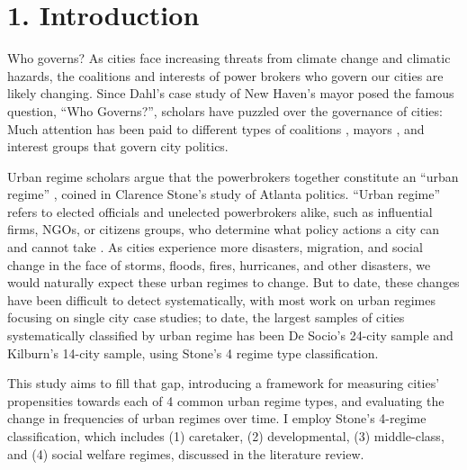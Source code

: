 \documentclass[preprint, 3p,
authoryear]{elsarticle} %
\begin{document}
\captionsetup[table]{labelformat=empty}
\captionsetup[figure]{labelformat=empty}
\captionsetup{font=large}

\hypertarget{introduction}{%
\section{1. Introduction}\label{introduction}}

Who governs? As cities face increasing threats from climate change and
climatic hazards, the coalitions and interests of power brokers who
govern our cities are likely changing. Since Dahl's
\citeyearpar{dahl_1961} case study of New Haven's mayor posed the famous
question, ``Who Governs?'', scholars have puzzled over the governance of
cities: Much attention has been paid to different types of coalitions
\citep{munoz_and_henry_1986, stone_1989, stoker_and_mossberger_1994, gilliam_1996, davies_2017, russo_and_scarnato_2018},
mayors
\citep{ramirez_perez_et_al_2008, debenedictis_kessner_and_warshaw_2016, freier_and_thomasius_2016, einstein_and_glick_2018},
and interest groups
\citep{logan_and_rabrenovic_1990, mossberger_and_stoker_2001, cooper_et_al_2005, portney_and_berry_2016, anzia_2019}
that govern city politics.

Urban regime scholars argue that the powerbrokers together constitute an
``urban regime'' \citep{stone_1993}, coined in Clarence Stone's
\citeyearpar{stone_1989} study of Atlanta politics. ``Urban regime''
refers to elected officials and unelected powerbrokers alike, such as
influential firms, NGOs, or citizens groups, who determine what policy
actions a city can and cannot take \citep{mossberger_and_stoker_2001}.
As cities experience more disasters, migration, and social change in the
face of storms, floods, fires, hurricanes, and other disasters, we would
naturally expect these urban regimes to change. But to date, these
changes have been difficult to detect systematically, with most work on
urban regimes focusing on single city case studies; to date, the largest
samples of cities systematically classified by urban regime has been De
Socio's \citeyearpar{de_socio_2007} 24-city sample and Kilburn's
\citeyearpar{kilburn_2004} 14-city sample, using Stone's
\citeyearpar{stone_1993} 4 regime type classification.

This study aims to fill that gap, introducing a framework for measuring
cities' propensities towards each of 4 common urban regime types, and
evaluating the change in frequencies of urban regimes over time. I
employ Stone's \citeyearpar{stone_1993} 4-regime classification, which
includes (1) caretaker, (2) developmental, (3) middle-class, and (4)
social welfare regimes, discussed in the literature review.
\end{document}

